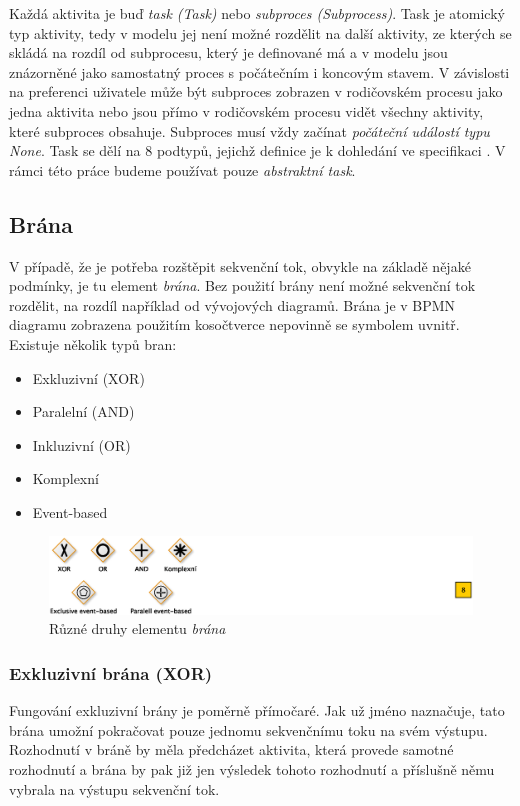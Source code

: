 Každá aktivita je buď \textit{task (Task)} nebo \textit{subproces (Subprocess)}. Task je atomický typ aktivity, tedy v modelu jej není možné rozdělit na další aktivity, ze kterých se skládá na rozdíl od subprocesu, který je definované má a v modelu jsou znázorněné jako samostatný proces s počátečním i koncovým stavem. V závislosti na preferenci uživatele může být subproces zobrazen v rodičovském procesu jako jedna  aktivita nebo jsou přímo v rodičovském procesu vidět všechny aktivity, které subproces obsahuje. Subproces musí vždy začínat \textit{počáteční událostí typu None}. Task se dělí na 8 podtypů, jejichž definice je k dohledání ve specifikaci \cite{Omg2011}. V rámci této práce budeme používat pouze \textit{abstraktní task}.

\subsection{Brána}
V případě, že je potřeba rozštěpit sekvenční tok, obvykle na základě nějaké podmínky, je tu element \textit{brána}. Bez použití brány není možné sekvenční tok rozdělit, na rozdíl například od vývojových diagramů. Brána je v BPMN diagramu zobrazena použitím kosočtverce nepovinně se symbolem uvnitř. Existuje několik typů bran:

\begin{itemize}
\item Exkluzivní (XOR)
\item Paralelní (AND)
\item Inkluzivní (OR)
\item Komplexní
\item Event-based
\end{itemize}

\begin{figure}[H]\centering
\includegraphics{obrazky/gateway-types}
\caption{Různé druhy elementu \textit{brána}}
\label{fig:brany}
\end{figure}

\subsubsection{Exkluzivní brána (XOR)}
Fungování exkluzivní brány je poměrně přímočaré. Jak už jméno naznačuje, tato brána umožní pokračovat pouze jednomu sekvenčnímu toku na svém výstupu. Rozhodnutí v bráně by měla předcházet aktivita, která provede samotné rozhodnutí a brána by pak již jen  výsledek tohoto rozhodnutí a příslušně němu vybrala na výstupu sekvenční tok.

